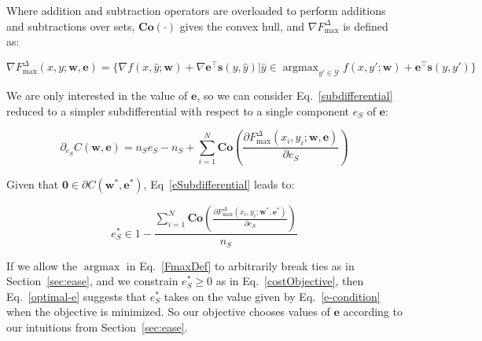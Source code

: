 \documentclass{article} %
\DeclareMathOperator*{\argmax}{argmax}
\newcommand{\bmcomment}[1]{\textcolor{blue}{\textsc{\textbf{[#1 --bm]}}}}
\newcommand{\nascomment}[1]{\textcolor{red}{\textsc{\textbf{[#1 --nas]}}}}
\begin{document}
Where addition and subtraction operators are overloaded to perform 
additions and subtractions over sets, 
$\mathbf{Co}(\cdot)$ gives the convex hull, and 
$\nabla F^{\Delta}_{\max}$ is defined as:

\begin{equation}
\label{FmaxDef}
\nabla F^{\Delta}_{\max}(x,y;\mathbf{w},\mathbf{e}) = 
\{ \nabla f(x, \hat{y} ; \mathbf{w}) +
\nabla \mathbf{e}^\top \mathbf{s}(y, \hat{y})
| \hat{y}\in\argmax_{y' \in \mathcal{Y}} f(x, y' ; \mathbf{w}) +
\mathbf{e}^\top \mathbf{s}(y, y') \}
\end{equation}

We are only interested in the value of $\mathbf{e}$, so
we can consider Eq.~\ref{subdifferential} reduced to 
a simpler subdifferential 
with respect to a single component $e_S$ of $\mathbf{e}$:

\begin{equation}
\label{eSubdifferential}
\partial_{e_S} C(\mathbf{w},\mathbf{e}) = 
n_S e_S -n_S+
\sum_{i=1}^N 
\mathbf{Co}(\frac{\partial 
F^{\Delta}_{\max}(x_i,y_i;\mathbf{w},\mathbf{e})}{\partial e_S})
\end{equation}

Given that $\mathbf{0}\in \partial C(\mathbf{w}^*,\mathbf{e}^*)$,
Eq~\ref{eSubdifferential} leads to:

\begin{equation}
\label{optimal-e}
e_S^*\in 1 - \frac{\sum_{i=1}^N 
\mathbf{Co}(\frac{\partial 
F^{\Delta}_{\max}(x_i,y_i;\mathbf{w}^*,\mathbf{e}^*)}{\partial e_S})}{n_S}
\end{equation}

If we allow the $\argmax$ in Eq.~\ref{FmaxDef} to arbitrarily break
ties as in Section~\ref{sec:ease}, and we constrain $e^*_S\geq 0$ as in
Eq.~\ref{costObjective}, then Eq.~\ref{optimal-e} suggests that 
$e^*_S$ takes on the value given by Eq.~\ref{e-condition} when the
objective is minimized.  So our objective chooses values of 
$\mathbf{e}$ according to our intuitions from Section~\ref{sec:ease}.


\end{document}
